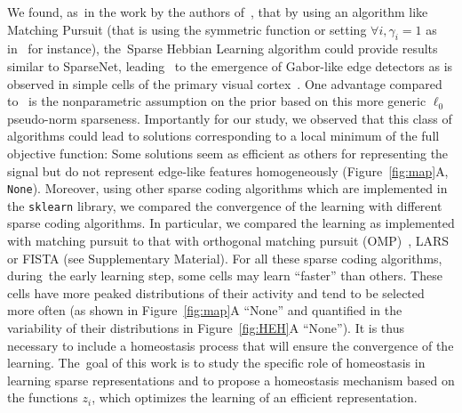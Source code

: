 \documentclass[vision,article,accept,oneauthor,pdftex]{Definitions/mdpi}
\newcommand{\seeFig}[1]{Figure~\ref{fig:#1}}%
\begin{document}
We found, as~in the work by the authors of~\citep{Rehn07}, that by using an algorithm like Matching Pursuit (that is using the symmetric function or setting $\forall i, \gamma_i=1$ as in~\citep{Mairal14} for instance), the~Sparse Hebbian Learning algorithm could provide results similar to {\sc SparseNet}, leading~ to the emergence of Gabor-like edge detectors as is observed in simple cells of the primary visual cortex~\citep{Fischer07}. One advantage compared to~\citep{Olshausen97} is the nonparametric assumption on the prior based on this more generic $\ell_0$ pseudo-norm sparseness. Importantly for our study, we observed that this class of algorithms could lead to solutions corresponding to a local minimum of the full objective function: Some solutions seem as efficient as others for representing the signal but do not represent edge-like features homogeneously (\seeFig{map}A, \texttt{None}). %
Moreover, using other sparse coding algorithms which are implemented in the \verb+sklearn+ library, we compared the convergence of the learning with different sparse coding algorithms. In particular, we compared the learning as implemented with matching pursuit to that with orthogonal matching pursuit (OMP)~\citep{pati1993orthogonal}, LARS or FISTA (see Supplementary Material). %
For all these sparse coding algorithms, during~the early learning step, some cells may learn ``faster'' than others. These cells have more peaked distributions of their activity and tend to be selected more often (as shown in Figure~\ref{fig:map}A ``None'' and quantified in the variability of their distributions in Figure~\ref{fig:HEH}A ``None''). It is thus necessary to include a homeostasis process that will ensure the convergence of the learning. The~goal of this work is to study the specific role of homeostasis in learning sparse representations and to propose a homeostasis mechanism based on the functions $z_i$, which optimizes the learning of an efficient representation.%
\end{document}

